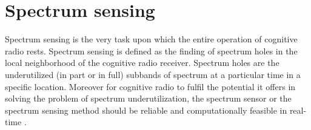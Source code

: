 \chapter{Spectrum sensing}

Spectrum sensing is the very task upon which the entire operation of cognitive
radio rests. Spectrum sensing is defined as the finding of spectrum holes in 
the local neighborhood of the cognitive radio receiver. Spectrum holes are the
underutilized (in part or in full) subbands of spectrum at a particular time
in a specific location. Moreover for cognitive radio to fulfil the potential
it offers in solving the problem of spectrum underutilization, the spectrum 
sensor or the spectrum sensing method should be reliable and computationally
feasible in real-time \cite{haykin09}.